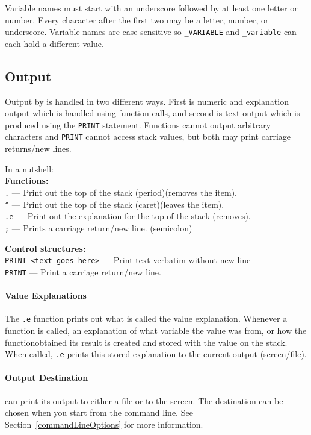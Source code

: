 Variable names must start with an underscore followed by at least one letter
or number. Every character after the first two may be a letter, number, or
underscore. Variable names are case sensitive so \texttt{\_VARIABLE} and
\texttt{\_variable} can each hold a different value.

\subsection{Output}
\label{output}
Output by \progLogo is handled in two different ways. First is numeric and
explanation output which is handled using function calls, and second is
text output which is produced using the \texttt{PRINT} statement. Functions
cannot output arbitrary characters and \texttt{PRINT} cannot access stack
values, but both may print carriage returns/new lines.

\noindent In a nutshell:\\
\textbf{Functions:}\\
\texttt{.} --- Print out the top of the stack (period)(removes the item).\\
\texttt{\^} --- Print out the top of the stack (caret)(leaves the item).\\
\texttt{.e} --- Print out the explanation for the top of the stack (removes).\\
\texttt{;} --- Prints a carriage return/new line. (semicolon)

\noindent\textbf{Control structures:}\\
\texttt{PRINT <text goes here>} --- Print text verbatim without new line\\
\texttt{PRINT} --- Print a carriage return/new line.

\paragraph*{Value Explanations\\}
\hspace*{\parindent}%
The \texttt{.e} function prints out what is called the value explanation.
Whenever a function is called, an explanation of what variable the value was
from, or how the functionobtained its result is created and stored with the
value on the stack. When called, \texttt{.e} prints this stored explanation
to the current output (screen/file).

\paragraph*{Output Destination\\}
\hspace*{\parindent}%
\progLogo can print its output to either a file or to the screen.
The destination can be chosen when you start \progLogo from the command line.
See Section~\ref{commandLineOptions} for more information.

